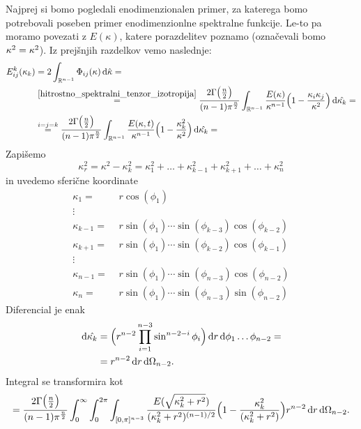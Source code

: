 \documentclass[mat2, tisk]{fmfdelo}
\newcommand{\R}{\mathbb R}
\newcommand{\bd}{\textbf}
\begin{document}
Najprej si bomo pogledali enodimenzionalen primer, za katerega bomo
potrebovali poseben primer enodimenzionlne spektralne funkcije. Le-to pa moramo 
povezati z $E(\kappa)$, katere porazdelitev poznamo (označevali bomo $\bd{\text{$\kappa$}}^2 = \kappa^2$). Iz prejšnjih razdelkov vemo 
naslednje: 
\begin{align*}
E_{ij}^k(\kappa_k) &= 2 \int_{\R^{n-1}}\Phi_{ij}(\bd{\text{$\kappa$}}) \dif \hat{\bd{\text{$\kappa$}}} = \\
&\stackrel{\ref{hitrostno_spektralni_tenzor_izotropija}}{=} \frac{2\Gamma\big(\frac{n}{2}\big)}{(n-1)\pi^\frac{n}{2}} \int_{\R^{n-1}} \frac{E(\kappa)}{\kappa^{n-1}}\Big(1 - \frac{\kappa_i \kappa_j}{\kappa^2}\Big)\dif \hat{\bd{\text{$\kappa_k$}}} = \\
&\stackrel{i=j=k}{=} \frac{2\Gamma\big(\frac{n}{2}\big)}{(n-1)\pi^\frac{n}{2}} \int_{\R^{n-1}} \frac{E(\kappa, t)}{\kappa^{n-1}}\Big(1 - \frac{\kappa_k^2}{\kappa^2}\Big)\dif \hat{\bd{\text{$\kappa_k$}}} = 
\end{align*}
Zapišemo 
$$
\kappa_r^2 = \kappa^2 - \kappa_k^2 = \kappa_1^2 + \dots + \kappa_{k-1}^2 + \kappa_{k+1}^2 + \dots + \kappa_n^2
$$
in uvedemo sferične koordinate 
\begin{align*}
\kappa_1 =& \,\,r\cos(\phi_1) \\
\vdots &\\
\kappa_{k-1} =& \,\,r\sin(\phi_{1}) \cdots \sin(\phi_{k-3}) \cos(\phi_{k-2})\\
\kappa_{k+1} =& \,\,r\sin(\phi_{1}) \cdots \sin(\phi_{k-2}) \cos(\phi_{k-1})\\
\vdots &\\
\kappa_{n-1} =& \,\,r\sin(\phi_{1}) \cdots \sin(\phi_{n-3}) \cos(\phi_{n-2})\\
\kappa_{n} =& \,\,r\sin(\phi_{1}) \cdots \sin(\phi_{n-3}) \sin(\phi_{n-2})
\end{align*}
Diferencial je enak 
\begin{align*}
\dif \hat{\bd{\text{$\kappa_k$}}} &= \Big(r^{n-2} \prod_{i=1}^{n-3} \sin^{n-2-i}{\phi_i}\Big) \dif r \dif \phi_1 \dots \phi_{n-2} = \\
&= r^{n-2} \dif r \dif \Omega_{n-2}.
\end{align*}
Integral se transformira kot
\begin{align*}
= \frac{2\Gamma\big(\frac{n}{2}\big)}{(n-1)\pi^\frac{n}{2}} \int_{0}^\infty \int_{0}^{2\pi} \int_{[0,\pi]^{n-3}}\frac{E(\sqrt{\kappa_k^2 + r^2})}{(\kappa_k^2 + r^2)^{(n-1)/2}}\Big(1 - \frac{\kappa_k^2}{(\kappa_k^2 + r^2)}\Big) r^{n-2} \dif r \dif \Omega_{n-2}.
\end{align*}
\end{document}

